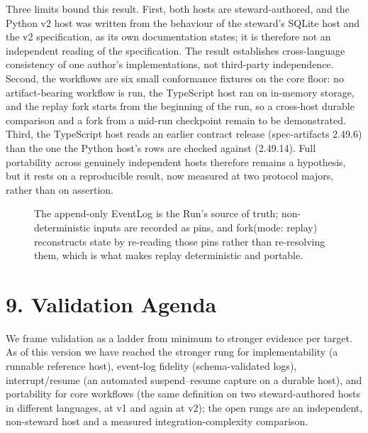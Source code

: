 \documentclass[11pt]{article}
\begin{document}
Three limits bound this result. First, both hosts are steward-authored, and the Python v2 host was written from the behaviour of the steward's SQLite host and the v2 specification, as its own documentation states; it is therefore not an independent reading of the specification. The result establishes cross-language consistency of one author's implementations, not third-party independence. Second, the workflows are six small conformance fixtures on the core floor: no artifact-bearing workflow is run, the TypeScript host ran on in-memory storage, and the replay fork starts from the beginning of the run, so a cross-host durable comparison and a fork from a mid-run checkpoint remain to be demonstrated. Third, the TypeScript host reads an earlier contract release (spec-artifacts 2.49.6) than the one the Python host's rows are checked against (2.49.14). Full portability across genuinely independent hosts therefore remains a hypothesis, but it rests on a reproducible result, now measured at two protocol majors, rather than on assertion.

\begin{figure}[H]\centering
{}
\caption{The append-only EventLog is the Run's source of truth; non-deterministic inputs are recorded as pins, and fork(mode: replay) reconstructs state by re-reading those pins rather than re-resolving them, which is what makes replay deterministic and portable.}
\end{figure}
\section*{9. Validation Agenda}
We frame validation as a ladder from minimum to stronger evidence per target. As of this version we have reached the stronger rung for implementability (a runnable reference host), event-log fidelity (schema-validated logs), interrupt/resume (an automated suspend--resume capture on a durable host), and portability for core workflows (the same definition on two steward-authored hosts in different languages, at v1 and again at v2); the open rungs are an independent, non-steward host and a measured integration-complexity comparison.
\end{document}
